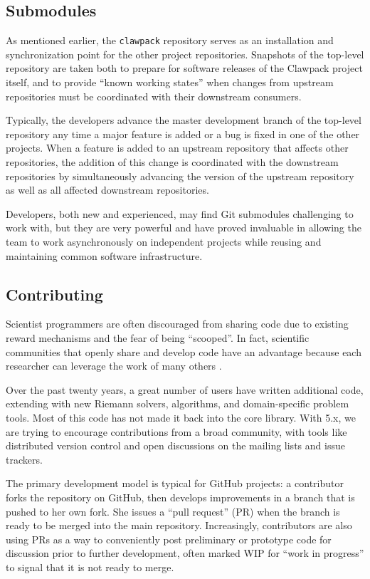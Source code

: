 \subsection{Submodules}

As mentioned earlier, the \texttt{clawpack} repository serves as an
installation and synchronization point for the other project repositories.
Snapshots of the top-level repository are taken both to prepare for
software releases of the Clawpack project itself, and to provide
``known working states'' when changes from upstream repositories must
be coordinated with their downstream consumers.

Typically, the \clawpack developers advance the master development
branch of the top-level repository any time a major feature is added
or a bug is fixed in one of the other projects.  When a feature is
added to an upstream repository that affects other repositories, the
addition of this change is coordinated with the downstream
repositories by simultaneously advancing the version of the upstream
repository as well as all affected downstream repositories.

Developers, both new and experienced, may find Git submodules challenging
to work with, but they are very powerful and
have proved invaluable in allowing the \clawpack team to
work asynchronously on independent projects while reusing and maintaining
common software infrastructure.


\subsection{Contributing}

Scientist programmers are often discouraged from sharing code
due to existing reward mechanisms and the fear of being ``scooped''.
In fact, scientific communities that openly share and develop code
have an advantage because each researcher can leverage the work of
many others \cite{Turk:2013hd}.

Over the past twenty years, a great number of users have written
additional code, extending \clawpack with new Riemann solvers,
algorithms, and domain-specific problem tools.  Most of this code
has not made it back into the core library.  With \clawpack 5.x,
we are trying to encourage contributions from a broad community, with
tools like distributed version control and open discussions on
the mailing lists and issue trackers.

The primary development model is typical for GitHub projects: a
contributor forks the repository on GitHub, then develops improvements
in a branch that is pushed to her own fork.  She issues a ``pull
request'' (PR) when the branch is ready to be merged into the main
repository.  Increasingly, contributors are also using PRs as a way to
conveniently post preliminary or prototype code for discussion prior
to further development, often marked WIP for ``work in progress'' to signal
that it is not ready to merge.

